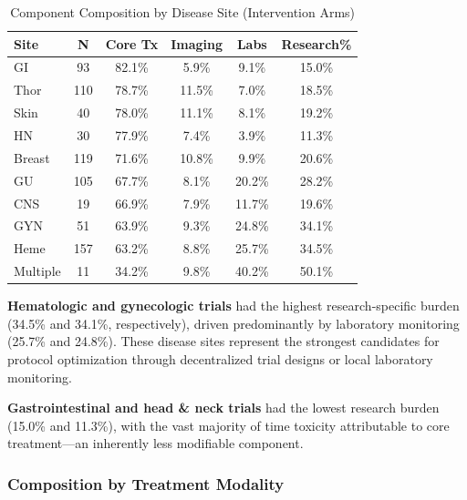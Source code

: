 \documentclass[11pt,a4paper]{article}
\begin{document}
\begin{table}[H]
\centering
\caption{Component Composition by Disease Site (Intervention Arms)}
\label{tab:component_site}
\begin{tabular}{lccccc}
\toprule
\textbf{Site} & \textbf{N} & \textbf{Core Tx} & \textbf{Imaging} & \textbf{Labs} & \textbf{Research\%} \\
\midrule
GI & 93 & 82.1\% & 5.9\% & 9.1\% & 15.0\% \\
Thor & 110 & 78.7\% & 11.5\% & 7.0\% & 18.5\% \\
Skin & 40 & 78.0\% & 11.1\% & 8.1\% & 19.2\% \\
HN & 30 & 77.9\% & 7.4\% & 3.9\% & 11.3\% \\
Breast & 119 & 71.6\% & 10.8\% & 9.9\% & 20.6\% \\
GU & 105 & 67.7\% & 8.1\% & 20.2\% & 28.2\% \\
CNS & 19 & 66.9\% & 7.9\% & 11.7\% & 19.6\% \\
GYN & 51 & 63.9\% & 9.3\% & 24.8\% & 34.1\% \\
Heme & 157 & 63.2\% & 8.8\% & 25.7\% & 34.5\% \\
Multiple & 11 & 34.2\% & 9.8\% & 40.2\% & 50.1\% \\
\bottomrule
\end{tabular}
\end{table}

\textbf{Hematologic and gynecologic trials} had the highest research-specific burden (34.5\% and 34.1\%, respectively), driven predominantly by laboratory monitoring (25.7\% and 24.8\%). These disease sites represent the strongest candidates for protocol optimization through decentralized trial designs or local laboratory monitoring.

\textbf{Gastrointestinal and head \& neck trials} had the lowest research burden (15.0\% and 11.3\%), with the vast majority of time toxicity attributable to core treatment---an inherently less modifiable component.

\subsubsection{Composition by Treatment Modality}
\end{document}
